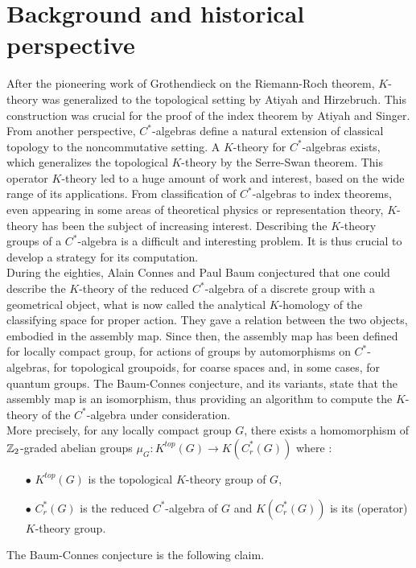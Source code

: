 \section*{Background and historical perspective}

After the pioneering work of Grothendieck on the Riemann-Roch theorem, $K$-theory was generalized to the topological setting by Atiyah and Hirzebruch. This construction was crucial for the proof of the index theorem by Atiyah and Singer. From another perspective, $C^*$-algebras define a natural extension of classical topology to the noncommutative setting. A $K$-theory for $C^*$-algebras exists, which generalizes the topological $K$-theory by the Serre-Swan theorem. This operator $K$-theory led to a huge amount of work and interest, based on the wide range of its applications. From classification of $C^*$-algebras to index theorems, even appearing in some areas of theoretical physics or representation theory, $K$-theory has been the subject of increasing interest. Describing the $K$-theory groups of a $C^*$-algebra is a difficult and interesting problem. It is thus crucial to develop a strategy for its computation.\\


During the eighties, Alain Connes and Paul Baum conjectured that one could describe the $K$-theory of the reduced $C^*$-algebra of a discrete group with a geometrical object, what is now called the analytical $K$-homology of the classifying space for proper action. They gave a relation between the two objects, embodied in the assembly map. Since then, the assembly map has been defined for locally compact group, for actions of groups by automorphisms on $C^*$-algebras, for topological groupoids, for coarse spaces and, in some cases, for quantum groups. The Baum-Connes conjecture, and its variants, state that the assembly map is an isomorphism, thus providing an algorithm to compute the $K$-theory of the $C^*$-algebra under consideration.\\

More precisely, for any locally compact group $G$, there exists a homomorphism of $\mathbb Z_2$-graded abelian groups $\mu_G : K^{top}(G)\rightarrow K(C_r^*(G))$ where :\\
\begin{itemize}
\item[$\bullet$] $K^{top}(G)$ is the topological $K$-theory group of $G$,
\item[$\bullet$] $C^*_r(G)$ is the reduced $C^*$-algebra of $G$ and $K(C_r^*(G))$ is its (operator) $K$-theory group.\\
\end{itemize}
The Baum-Connes conjecture is the following claim.

